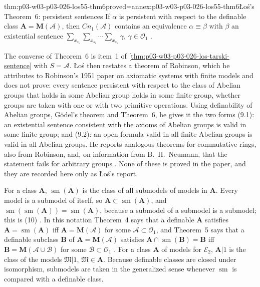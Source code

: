 \begin{hbtheorem}{thm:p03-w03-p03-026-los55-thm6}{proved=annex:p03-w03-p03-026-los55-thm6}{\L o\'s's Theorem~6: persistent sentences}
If \(\alpha\) is persistent with respect to the definable class
\(\mathbf A=\mathbf M(\mathcal A)\), then \(\mathit{Cn}_1(\mathcal A)\)
contains an equivalence \(\alpha\equiv\beta\) with \(\beta\) an existential
sentence \(\sum_{x_{s_1}}\sum_{x_{s_2}}\cdots\sum_{x_{s_n}}\gamma\),
\(\gamma\in\mathcal O_1\) \cite[p.~48]{Los1955}.
\end{hbtheorem}

The converse of Theorem~6 is item~1 of
\cref{thm:p03-w03-p03-026-los-tarski-sentence} with \(S=\mathcal A\).  \L o\'s
then restates a theorem of Robinson, which he attributes to Robinson's 1951
paper on axiomatic systems with finite models and does not prove: every
sentence persistent with respect to the class of Abelian groups that holds in
some Abelian group holds in some finite group, whether groups are taken with
one or with two primitive operations.  Using definability of Abelian groups,
G\"odel's theorem and Theorem~6, he gives it the two forms (9.1): an
existential sentence consistent with the axioms of Abelian groups is valid in
some finite group; and (9.2): an open formula valid in all finite Abelian
groups is valid in all Abelian groups.  He reports analogous theorems for
commutative rings, also from Robinson, and, on information from
B.~H.~Neumann, that the statement fails for arbitrary groups
\cite[p.~48]{Los1955}.  None of these is proved in the paper, and they are
recorded here only as \L o\'s's report.

For a class \(\mathbf A\), \(\operatorname{sm}(\mathbf A)\) is the class of
all submodels of models in \(\mathbf A\).  Every model is a submodel of
itself, so \(\mathbf A\subset\operatorname{sm}(\mathbf A)\), and
\(\operatorname{sm}(\operatorname{sm}(\mathbf A))=\operatorname{sm}(\mathbf A)\),
because a submodel of a submodel is a submodel; this is (10)
\cite[pp.~48--49]{Los1955}.  In this notation Theorem~4 says that a
definable \(\mathbf A\) satisfies \(\mathbf A=\operatorname{sm}(\mathbf A)\)
iff \(\mathbf A=\mathbf M(\mathcal A)\) for some
\(\mathcal A\subset\mathcal O_1\), and Theorem~5 says that a definable
subclass \(\mathbf B\) of \(\mathbf A=\mathbf M(\mathcal A)\) satisfies
\(\mathbf A\cap\operatorname{sm}(\mathbf B)=\mathbf B\) iff
\(\mathbf B=\mathbf M(\mathcal A\cup\mathcal B)\) for some
\(\mathcal B\subset\mathcal O_1\) \cite[p.~49]{Los1955}.  For a class
\(\mathbf A\) of models for \(\mathcal E_2\), \(\mathbf A|1\) is the class of
the models \(\mathfrak M|1\), \(\mathfrak M\in\mathbf A\).  Because
definable classes are closed under isomorphism, submodels are taken in the
generalized sense whenever \(\operatorname{sm}\) is compared with a definable
class.

